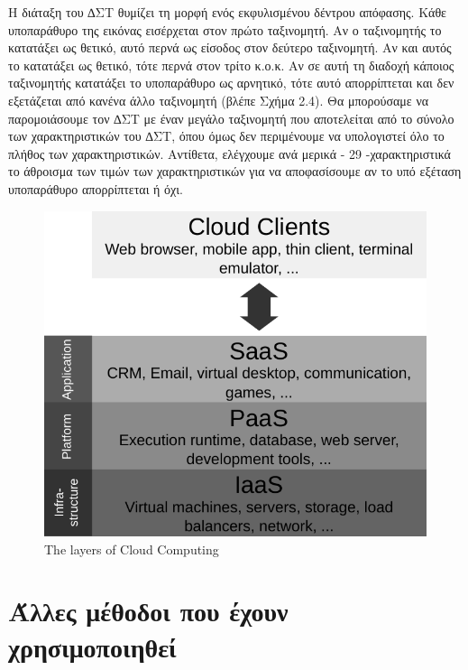 Η διάταξη του ∆ΣΤ θυμίζει τη μορφή ενός εκφυλισμένου δέντρου απόφασης. Κάθε
υποπαράθυρο της εικόνας εισέρχεται στον πρώτο ταξινομητή. Αν ο ταξινομητής το κατατάξει ως
θετικό, αυτό περνά ως είσοδος στον δεύτερο ταξινομητή. Αν και αυτός το κατατάξει ως θετικό,
τότε περνά στον τρίτο κ.ο.κ. Αν σε αυτή τη διαδοχή κάποιος ταξινομητής κατατάξει το
υποπαράθυρο ως αρνητικό, τότε αυτό απορρίπτεται και δεν εξετάζεται από κανένα άλλο
ταξινομητή (βλέπε Σχήμα 2.4). Θα μπορούσαμε να παρομοιάσουμε τον ∆ΣΤ με έναν μεγάλο
ταξινομητή που αποτελείται από το σύνολο των χαρακτηριστικών του ∆ΣΤ, όπου όμως δεν
περιμένουμε να υπολογιστεί όλο το πλήθος των χαρακτηριστικών. Αντίθετα, ελέγχουμε ανά μερικά
- 29 -χαρακτηριστικά το άθροισμα των τιμών των χαρακτηριστικών για να αποφασίσουμε αν το υπό
εξέταση υποπαράθυρο απορρίπτεται ή όχι.

\begin{figure}[htbp]
  \begin{center}
    \includegraphics[width=1.0\maxwidth]{../figures/cloud_layers-black.pdf}
    \caption{The layers of Cloud Computing\label{fig:cloud_layers}}
   \end{center}
\end{figure}
\section{Άλλες μέθοδοι που έχουν χρησιμοποιηθεί}\label{sec:othermethods}

